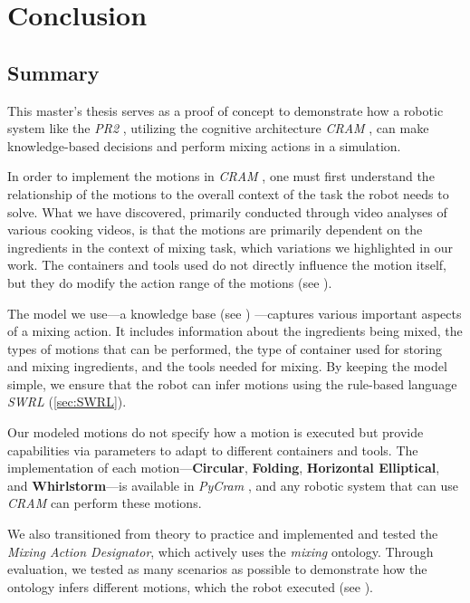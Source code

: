 \chapter{Conclusion}
\label{chap:conclusion}

\section{Summary}
This master's thesis serves as a proof of concept to demonstrate how a robotic system like the \textit{PR2} \cite{pr2}, utilizing the cognitive architecture \textit{CRAM} \cite{beetz10cram}, can make knowledge-based decisions and perform mixing actions in a simulation.

In order to implement the motions in \textit{CRAM} \cite{beetz10cram}, one must first understand the relationship of the motions to the overall context of the task the robot needs to solve. What we have discovered, primarily conducted through video analyses of various cooking videos, is that the motions are primarily dependent on the ingredients in the context of mixing task, which variations we highlighted in our work. The containers and tools used do not directly influence the motion itself, but they do modify the action range of the motions
(see ).

The model we use—a knowledge base (see ) —captures various important aspects of a mixing action. It includes information about the ingredients being mixed, the types of motions that can be performed, the type of container used for storing and mixing ingredients, and the tools needed for mixing. By keeping the model simple, we ensure that the robot can infer motions using the rule-based language \textit{SWRL} (\ref{sec:SWRL}).

Our modeled motions do not specify how a motion is executed but provide capabilities via parameters to adapt to different containers and tools. The implementation of each motion—\textbf{Circular}, \textbf{Folding}, \textbf{Horizontal Elliptical}, and \textbf{Whirlstorm}—is available in \textit{PyCram} \cite{pycram}, and any robotic system that can use \textit{CRAM} \cite{beetz10cram} can perform these motions.

We also transitioned from theory to practice and implemented and tested the \textit{Mixing Action Designator}, 
which actively uses the \textit{mixing} ontology. Through evaluation, we tested as many scenarios as possible to demonstrate how the 
ontology infers different motions, which the robot executed (see ).

